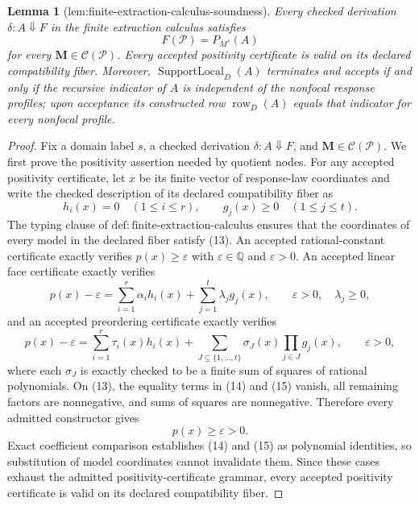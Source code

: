 \documentclass{article}
\newtheorem{lemma}{Lemma}
\begin{document}
\begin{lemma}[lem:finite-extraction-calculus-soundness]\label{lem:finite-extraction-calculus-soundness}
Every checked derivation \(\delta:A\Downarrow F\) in the finite extraction calculus satisfies
\[
F(\mathcal P)=P_{M^s}(A)
\]
for every \(\mathbf M\in\mathcal C(\mathcal P)\).  Every accepted positivity certificate is valid on its declared compatibility fiber.  Moreover, \(\operatorname{SupportLocal}_D(A)\) terminates and accepts if and only if the recursive indicator of \(A\) is independent of the nonfocal response profiles; upon acceptance its constructed row \(\operatorname{row}_D(A)\) equals that indicator for every nonfocal profile.
\end{lemma}
\begin{proof}
Fix a domain label \(s\), a checked derivation \(\delta:A\Downarrow F\), and \(\mathbf M\in\mathcal C(\mathcal P)\). We first prove the positivity assertion needed by quotient nodes. For any accepted positivity certificate, let \(x\) be its finite vector of response-law coordinates and write the checked description of its declared compatibility fiber as
\[
 h_i(x)=0\quad(1\le i\le r),
 \qquad
 g_j(x)\ge 0\quad(1\le j\le t).
\tag{13}
\]
The typing clause of \(\mathrm{def:finite\text{-}extraction\text{-}calculus}\) ensures that the coordinates of every model in the declared fiber satisfy (13). An accepted rational-constant certificate exactly verifies \(p(x)\ge\varepsilon\) with \(\varepsilon\in\mathbb Q\) and \(\varepsilon>0\). An accepted linear face certificate exactly verifies
\[
 p(x)-\varepsilon
 =\sum_{i=1}^{r}\alpha_i h_i(x)
  +\sum_{j=1}^{t}\lambda_j g_j(x),
 \qquad \varepsilon>0,\quad\lambda_j\ge 0,
\tag{14}
\]
and an accepted preordering certificate exactly verifies
\[
 p(x)-\varepsilon
 =\sum_{i=1}^{r}\tau_i(x)h_i(x)
  +\sum_{J\subseteq\{1,\ldots,t\}}
    \sigma_J(x)\prod_{j\in J}g_j(x),
 \qquad \varepsilon>0,
\tag{15}
\]
where each \(\sigma_J\) is exactly checked to be a finite sum of squares of rational polynomials. On (13), the equality terms in (14) and (15) vanish, all remaining factors are nonnegative, and sums of squares are nonnegative. Therefore every admitted constructor gives
\[
 p(x)\ge\varepsilon>0.
\tag{16}
\]
Exact coefficient comparison establishes (14) and (15) as polynomial identities, so substitution of model coordinates cannot invalidate them. Since these cases exhaust the admitted positivity-certificate grammar, every accepted positivity certificate is valid on its declared compatibility fiber.


\end{proof}
\end{document}
